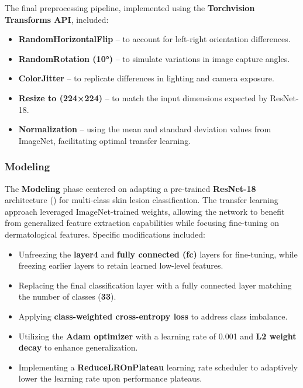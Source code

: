\documentclass[
  12pt,
  oneside]{article}
\providecommand{\tightlist}{%
  \setlength{\itemsep}{0pt}\setlength{\parskip}{0pt}}
\begin{document}
The final preprocessing pipeline, implemented using the
\textbf{Torchvision Transforms API}, included:

\begin{itemize}
\tightlist
\item
  \textbf{RandomHorizontalFlip} -- to account for left-right orientation
  differences.
\item
  \textbf{RandomRotation (10°)} -- to simulate variations in image
  capture angles.
\item
  \textbf{ColorJitter} -- to replicate differences in lighting and
  camera exposure.
\item
  \textbf{Resize to (224×224)} -- to match the input dimensions expected
  by ResNet-18.
\item
  \textbf{Normalization} -- using the mean and standard deviation values
  from ImageNet, facilitating optimal transfer learning.
\end{itemize}

\subsubsection{Modeling}\label{modeling}

The \textbf{Modeling} phase centered on adapting a pre-trained
\textbf{ResNet-18} architecture () for multi-class skin lesion classification. The transfer learning
approach leveraged ImageNet-trained weights, allowing the network to
benefit from generalized feature extraction capabilities while focusing
fine-tuning on dermatological features. Specific modifications included:

\begin{itemize}
\tightlist
\item
  Unfreezing the \textbf{layer4} and \textbf{fully connected (fc)}
  layers for fine-tuning, while freezing earlier layers to retain
  learned low-level features.
\item
  Replacing the final classification layer with a fully connected layer
  matching the number of classes (\textbf{33}).
\item
  Applying \textbf{class-weighted cross-entropy loss} to address class
  imbalance.
\item
  Utilizing the \textbf{Adam optimizer} with a learning rate of 0.001
  and \textbf{L2 weight decay} to enhance generalization.
\item
  Implementing a \textbf{ReduceLROnPlateau} learning rate scheduler to
  adaptively lower the learning rate upon performance plateaus.
\end{itemize}
\end{document}
